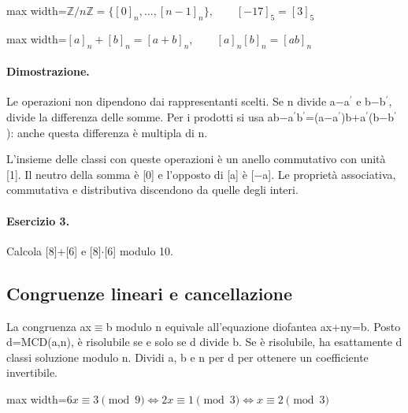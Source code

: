 \documentclass[a4paper,11pt]{article}
\begin{document}
\begin{center}\begin{adjustbox}{max width=\linewidth}$\displaystyle \mathbb Z/n\mathbb Z=\{[0]_n,\ldots,[n-1]_n\},\qquad [-17]_5=[3]_5$\end{adjustbox}\end{center}

\begin{center}\begin{adjustbox}{max width=\linewidth}$\displaystyle [a]_n+[b]_n=[a+b]_n,\qquad [a]_n[b]_n=[ab]_n$\end{adjustbox}\end{center}

\paragraph{Dimostrazione.} Le operazioni non dipendono dai rappresentanti scelti. Se n divide a$-$a${}^{\prime}$ e b$-$b${}^{\prime}$, divide la differenza delle somme. Per i prodotti si usa ab$-$a${}^{\prime}$b${}^{\prime}$=(a$-$a${}^{\prime}$)b+a${}^{\prime}$(b$-$b${}^{\prime}$): anche questa differenza è multipla di n.

L’insieme delle classi con queste operazioni è un anello commutativo con unità [1]. Il neutro della somma è [0] e l’opposto di [a] è [$-$a]. Le proprietà associativa, commutativa e distributiva discendono da quelle degli interi.

\paragraph{Esercizio 3.} Calcola [8]+[6] e [8]$\cdot$[6] modulo 10.

\subsection{Congruenze lineari e cancellazione}

La congruenza ax$\equiv$b modulo n equivale all’equazione diofantea ax+ny=b. Posto d=MCD(a,n), è risolubile se e solo se d divide b. Se è risolubile, ha esattamente d classi soluzione modulo n. Dividi a, b e n per d per ottenere un coefficiente invertibile.

\begin{center}\begin{adjustbox}{max width=\linewidth}$\displaystyle 6x\equiv3\pmod9\iff2x\equiv1\pmod3\iff x\equiv2\pmod3$\end{adjustbox}\end{center}
\end{document}
